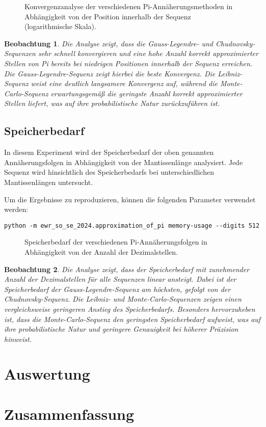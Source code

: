 \documentclass{scrartcl}
\newtheorem{approximation sequence}{Annäherungsfolge}
\newtheorem{observation}{Beobachtung}
\begin{document}
\begin{figure}[H]
    \centering
    
    \caption{Konvergenzanalyse der verschiedenen Pi-Annäherungsmethoden in Abhängigkeit von der Position innerhalb der Sequenz (logarithmische Skala).}
    \label{fig:convergence-analysis}
\end{figure}

\begin{observation}
    Die Analyse zeigt, dass die Gauss-Legendre- und Chudnovsky-Sequenzen sehr
    schnell konvergieren und eine hohe Anzahl korrekt approximierter Stellen
    von Pi bereits bei niedrigen Positionen innerhalb der Sequenz erreichen.
    Die Gauss-Legendre-Sequenz zeigt hierbei die beste Konvergenz. Die
    Leibniz-Sequenz weist eine deutlich langsamere Konvergenz auf, während die
    Monte-Carlo-Sequenz erwartungsgemäß die geringste Anzahl korrekt
    approximierter Stellen liefert, was auf ihre probabilistische Natur
    zurückzuführen ist.
\end{observation}

\subsection{Speicherbedarf}

In diesem Experiment wird der Speicherbedarf der oben genannten
Annäherungsfolgen in Abhängigkeit von der Mantissenlänge analysiert. Jede
Sequenz wird hinsichtlich des Speicherbedarfs bei unterschiedlichen
Mantissenlängen untersucht.

Um die Ergebnisse zu reproduzieren, können die folgenden Parameter verwendet
werden:
\begin{verbatim}
python -m ewr_so_se_2024.approximation_of_pi memory-usage --digits 512
\end{verbatim}

\begin{figure}[H]
    \centering
    
    \caption{Speicherbedarf der verschiedenen Pi-Annäherungsfolgen in Abhängigkeit von der Anzahl der Dezimalstellen.}
    \label{fig:memory-usage}
\end{figure}

\begin{observation}
    Die Analyse zeigt, dass der Speicherbedarf mit zunehmender Anzahl der
    Dezimalstellen für alle Sequenzen linear ansteigt. Dabei ist der
    Speicherbedarf der Gauss-Legendre-Sequenz am höchsten, gefolgt von der
    Chudnovsky-Sequenz. Die Leibniz- und Monte-Carlo-Sequenzen zeigen einen
    vergleichsweise geringeren Anstieg des Speicherbedarfs. Besonders
    hervorzuheben ist, dass die Monte-Carlo-Sequenz den geringsten
    Speicherbedarf aufweist, was auf ihre probabilistische Natur und geringere
    Genauigkeit bei höherer Präzision hinweist.
\end{observation}

\section{Auswertung}

\section{Zusammenfassung}

\printbibliography
\end{document}
